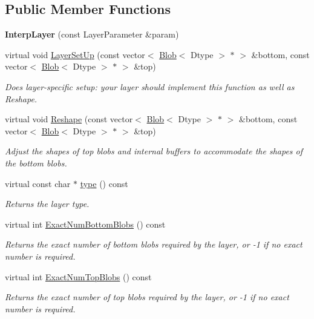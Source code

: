 \subsection*{Public Member Functions}
\begin{DoxyCompactItemize}
\item 
{\bfseries Interp\+Layer} (const Layer\+Parameter \&param)\hypertarget{classcaffe_1_1InterpLayer_a23b9c18e3e251c4f3e471303e11f3250}{}\label{classcaffe_1_1InterpLayer_a23b9c18e3e251c4f3e471303e11f3250}

\item 
virtual void \hyperlink{classcaffe_1_1InterpLayer_ac8f4627f1a04fa8d3e85eaac5f1fa291}{Layer\+Set\+Up} (const vector$<$ \hyperlink{classcaffe_1_1Blob}{Blob}$<$ Dtype $>$ $\ast$ $>$ \&bottom, const vector$<$ \hyperlink{classcaffe_1_1Blob}{Blob}$<$ Dtype $>$ $\ast$ $>$ \&top)
\begin{DoxyCompactList}\small\item\em Does layer-\/specific setup\+: your layer should implement this function as well as Reshape. \end{DoxyCompactList}\item 
virtual void \hyperlink{classcaffe_1_1InterpLayer_a738a790541cf3f1827afa9f71b835caa}{Reshape} (const vector$<$ \hyperlink{classcaffe_1_1Blob}{Blob}$<$ Dtype $>$ $\ast$ $>$ \&bottom, const vector$<$ \hyperlink{classcaffe_1_1Blob}{Blob}$<$ Dtype $>$ $\ast$ $>$ \&top)
\begin{DoxyCompactList}\small\item\em Adjust the shapes of top blobs and internal buffers to accommodate the shapes of the bottom blobs. \end{DoxyCompactList}\item 
virtual const char $\ast$ \hyperlink{classcaffe_1_1InterpLayer_af23cf9dac90fb66c89bed793d49874f3}{type} () const \hypertarget{classcaffe_1_1InterpLayer_af23cf9dac90fb66c89bed793d49874f3}{}\label{classcaffe_1_1InterpLayer_af23cf9dac90fb66c89bed793d49874f3}

\begin{DoxyCompactList}\small\item\em Returns the layer type. \end{DoxyCompactList}\item 
virtual int \hyperlink{classcaffe_1_1InterpLayer_a186c0c177d96da2dce60308d78959c2b}{Exact\+Num\+Bottom\+Blobs} () const 
\begin{DoxyCompactList}\small\item\em Returns the exact number of bottom blobs required by the layer, or -\/1 if no exact number is required. \end{DoxyCompactList}\item 
virtual int \hyperlink{classcaffe_1_1InterpLayer_a14e1a12b196cd87eef112d7a87d5e75e}{Exact\+Num\+Top\+Blobs} () const 
\begin{DoxyCompactList}\small\item\em Returns the exact number of top blobs required by the layer, or -\/1 if no exact number is required. \end{DoxyCompactList}\end{DoxyCompactItemize}
